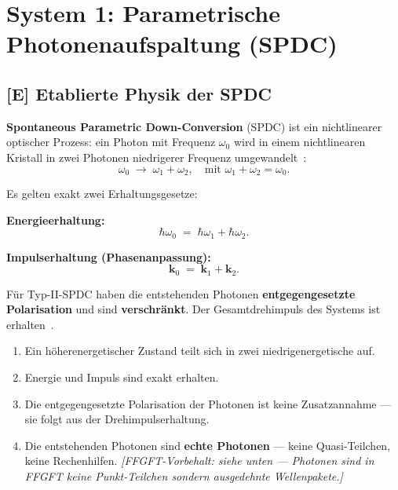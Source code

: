 \section{System 1: Parametrische Photonenaufspaltung (SPDC)}
\label{sec:spdc}

\subsection{[E] Etablierte Physik der SPDC}

\textbf{Spontaneous Parametric Down-Conversion} (SPDC) ist ein
nichtlinearer optischer Prozess: ein Photon mit Frequenz $\omega_0$
wird in einem nichtlinearen Kristall in zwei Photonen
niedrigerer Frequenz umgewandelt~\cite{Burnham1970}:
\begin{equation}
  \omega_0 \;\longrightarrow\; \omega_1 + \omega_2,
  \quad \text{mit } \omega_1 + \omega_2 = \omega_0.
\end{equation}

Es gelten exakt zwei Erhaltungsgesetze:

\textbf{Energieerhaltung:}
\begin{equation}
  \hbar\omega_0 \;=\; \hbar\omega_1 + \hbar\omega_2.
\end{equation}

\textbf{Impulserhaltung (Phasenanpassung):}
\begin{equation}
  \mathbf{k}_0 \;=\; \mathbf{k}_1 + \mathbf{k}_2.
\end{equation}

Für Typ-II-SPDC haben die entstehenden Photonen
\textbf{entgegengesetzte Polarisation} und sind \textbf{verschränkt}.
Der Gesamtdrehimpuls des Systems ist erhalten~\cite{Kwiat1995}.

\begin{keyresult}
\begin{enumerate}
  \item Ein höherenergetischer Zustand teilt sich in zwei
    niedrigenergetische auf.
  \item Energie und Impuls sind exakt erhalten.
  \item Die entgegengesetzte Polarisation der Photonen
    ist keine Zusatzannahme --- sie folgt aus der
    Drehimpulserhaltung.
  \item Die entstehenden Photonen sind \textbf{echte Photonen}
    --- keine Quasi-Teilchen, keine Rechenhilfen.
    \emph{[FFGFT-Vorbehalt: siehe unten --- Photonen sind in FFGFT
    keine Punkt-Teilchen sondern ausgedehnte Wellenpakete.]}
\end{enumerate}
\end{keyresult}

